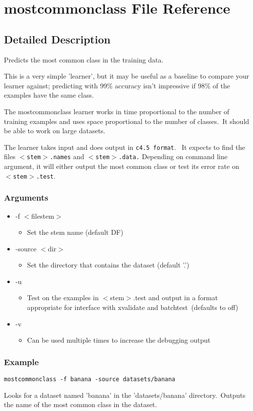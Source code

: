\section{mostcommonclass File Reference}
\label{mostcommonclass}


\subsection{Detailed Description}
Predicts the most common class in the training data. 

This is a very simple 'learner', but it may be useful as a baseline to compare your learner against; predicting with 99\% accuracy isn't impressive if 98\% of the examples have the same class.

The mostcommonclass learner works in time proportional to the number of training examples and uses space proportional to the number of classes.\  It should be able to work on large datasets.

The learner takes input and does output in {\tt c4.5 format}. \  It expects to find the files {\tt $<$stem$>$.names} and {\tt $<$stem$>$.data.} Depending on command line argument, it will either output the most common class or test its error rate on {\tt $<$stem$>$.test}.

\subsubsection*{Arguments}

\begin{itemize}
\item -f $<$filestem$>$ \begin{itemize}
\item Set the stem name (default DF)\par
\end{itemize}
\item -source $<$dir$>$ \begin{itemize}
\item Set the directory that contains the dataset (default '.')\par
\end{itemize}
\item -u \begin{itemize}
\item Test on the examples in $<$stem$>$.test and output in a format appropriate for interface with xvalidate and batchtest\  (defaults to off)\par
\end{itemize}
\item -v \begin{itemize}
\item Can be used multiple times to increase the debugging output \end{itemize}
\end{itemize}


\subsubsection*{Example}

{\tt mostcommonclass -f banana -source datasets/banana}

Looks for a dataset named 'banana' in the 'datasets/banana' directory.\  Outputs the name of the most common class in the dataset.

